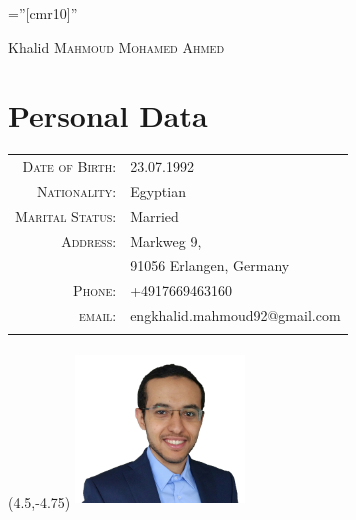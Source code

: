 \documentclass[a4paper,10pt]{article}
\begin{document}

\pagestyle{empty} %

\font\fb=''[cmr10]'' %

\par{\centering
		{\Huge Khalid \textsc{Mahmoud Mohamed Ahmed}
	}\bigskip\par}

\section{Personal Data}
\begin{tabular}{rl}
    \textsc{Date of Birth:} & 23.07.1992   \\
		\textsc{Nationality:} & Egyptian  \\ 
    \textsc{Marital Status:} & Married  \\
    \textsc{Address:}   & Markweg 9,  \\
    & 91056 Erlangen, Germany  \\
    \textsc{Phone:}     & +4917669463160 \\
    \textsc{email:}     & engkhalid.mahmoud92@gmail.com \\
    &
\end{tabular}
\begin{textblock}{2.5}(4.5,-4.75)
	\includegraphics[width=4.5cm,height=4.2cm]{khalid.jpg}
\end{textblock}
\end{document}
